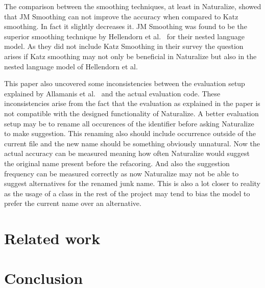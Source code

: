 \documentclass[sigconf]{acmart}
\begin{document}
The comparison between the smoothing techniques, at least in Naturalize, showed that JM Smoothing can not improve the accuracy when compared to Katz smoothing. In fact it slightly decreases it. JM Smoothing was found to be the superior smoothing technique by Hellendorn et al.~\cite{nestedngram} for their nested language model. As they did not include Katz Smoothing in their survey the question arises if Katz smoothing may not only be beneficial in Naturalize but also in the nested language model of Hellendorn et al.

This paper also uncovered some inconsistencies between the evaluation setup explained by Allamanis et al.~\cite{naturalize} and the actual evaluation code. These inconsistencies arise from the fact that the evaluation as explained in the paper is not compatible with the designed functionality of Naturalize. A better evaluation setup may be to rename all occurences of the identifier before asking Naturalize to make suggestion. This renaming also should include occurrence outside of the current file and the new name should be something obviously unnatural. Now the actual accuracy can be measured meaning how often Naturalize would suggest the original name present before the refacoring. And also the suggestion frequency can be measured correctly as now Naturalize may not be able to suggest alternatives for the renamed junk name. This is also a lot closer to reality as the usage of a class in the rest of the project may tend to bias the model to prefer the current name over an alternative.
\section{Related work}

\section{Conclusion}








\end{document}
